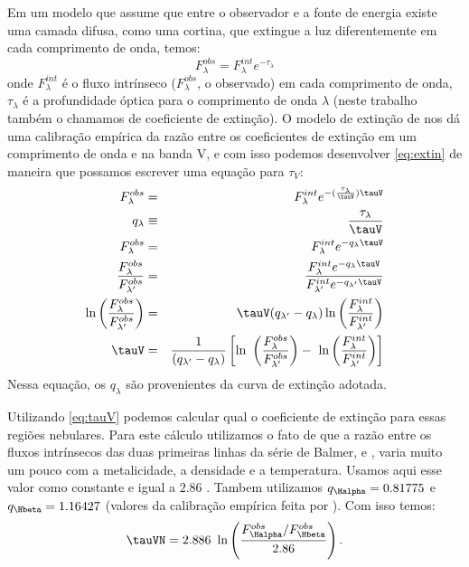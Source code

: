 Em um modelo que assume que entre o observador e a fonte de energia existe uma camada difusa, como
uma cortina, que extingue a luz diferentemente em cada comprimento de onda, temos:
\begin{equation}
	F_\lambda^{obs} = F_\lambda^{int} e^{-\tau_\lambda}
    \label{eq:extin}
\end{equation}
\noindent onde $F_\lambda^{int}$ é o fluxo intrínseco ($F_\lambda^{obs}$, o observado) em cada
comprimento de onda, $\tau_\lambda$ é a profundidade óptica para o comprimento de
onda $\lambda$ (neste trabalho também o chamamos de coeficiente de extinção). O modelo de extinção
de \citet{CCM1989a} nos dá uma calibração empírica da razão entre os coeficientes de extinção em um
comprimento de onda e na banda V, e com isso podemos desenvolver \eqref{eq:extin} de maneira que
possamos escrever uma equação para $\tau_V$:
\begin{eqnarray}
   F_\lambda^{obs} &=& F_\lambda^{int} e^{-(\frac{\tau_\lambda}{\tauV}) \tauV} \\
   q_\lambda &\equiv& \frac{\tau_\lambda}{\tauV} \\
   F_\lambda^{obs} &=& F_\lambda^{int} e^{-q_\lambda \tauV} \\
   \frac{F_\lambda^{obs}}{F_{\lambda^\prime}^{obs}} &=& \
 \frac{F_\lambda^{int} e^{-q_\lambda \tauV}}{F_{\lambda^\prime}^{int} e^{-q_{\lambda^\prime} \tauV}} \\
   \ln \left(\frac{F_\lambda^{obs}}{F_{\lambda^\prime}^{obs}}\right) &=& \
 \tauV (q_{\lambda^\prime} - q_\lambda) \ln \left(\frac{F_\lambda^{int}}{F_{\lambda^\prime}^{int}}\right) \\
   \tauV &=& \frac{1}{(q_{\lambda^\prime} - q_\lambda)} \left[\ln \
 \left(\frac{F_\lambda^{obs}}{F_{\lambda^\prime}^{obs}}\right) - \
 \ln \left(\frac{F_\lambda^{int}}{F_{\lambda^\prime}^{int}}\right)\right]
 \label{eq:tauV}
\end{eqnarray}
\noindent Nessa equação, os $q_\lambda$ são provenientes da curva de extinção adotada.

Utilizando \eqref{eq:tauV} podemos calcular qual o coeficiente de extinção para essas regiões
nebulares. Para este cálculo utilizamos o fato de que a razão entre os fluxos intrínsecos das duas
primeiras linhas da série de Balmer, \Halpha e \Hbeta, varia muito um pouco com a metalicidade, a
densidade e a temperatura. Usamos aqui esse valor como constante e igual a $2.86$
\citep[densidade eletrônica de $n = 100\ cm^{-3}$ e temperatura eletrônica $T_e = 10^4$ K;
][]{Osterbrock.Ferland.2006a}. Tambem utilizamos $q_{\Halpha}  = 0.81775$ e $q_{\Hbeta} = 1.16427$
(valores da calibração empírica feita por \citeauthor{CCM1989a}). Com isso temos:
\begin{equation}
	\tauVN = 2.886\ \ln \left( \frac{F_{\Halpha}^{obs}/F_{\Hbeta}^{obs}}{2.86} \right).
\end{equation}

